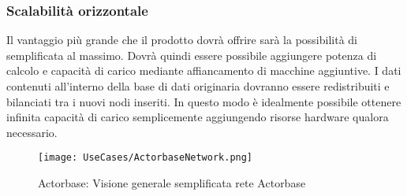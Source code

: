 \documentclass{scalatekids-article}
\begin{document}
\subsubsection{Scalabilità orizzontale}
Il vantaggio più grande che il prodotto dovrà offrire sarà la possibilità di
 semplificata al massimo. Dovrà quindi essere possibile
aggiungere potenza di calcolo e capacità di carico mediante affiancamento di
macchine aggiuntive. I dati contenuti all'interno della base di dati originaria
dovranno essere redistribuiti e bilanciati tra i nuovi nodi inseriti. In questo
modo è idealmente possibile ottenere infinita capacità di carico semplicemente
aggiungendo risorse hardware qualora necessario.
\begin{figure}[H]
  \begin{center}
    \texttt{[image: UseCases/ActorbaseNetwork.png]}
    \caption{Actorbase: Visione generale semplificata rete Actorbase}
  \end{center}
\end{figure}
\end{document}
